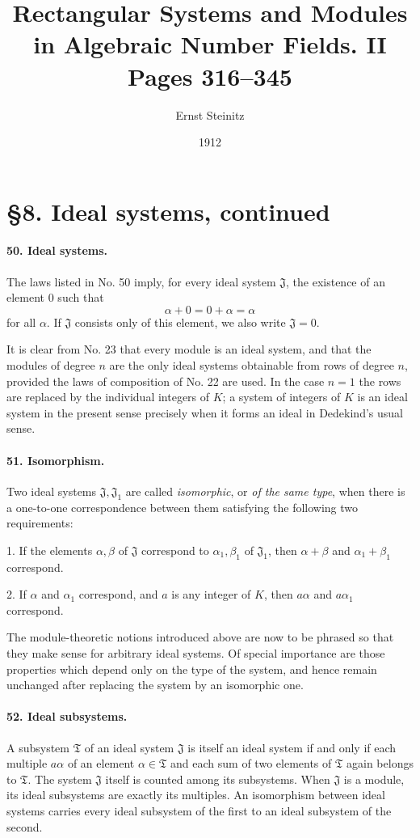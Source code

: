 \documentclass[11pt]{article}
\title{Rectangular Systems and Modules in Algebraic Number Fields. II\\\large Pages 316--345}
\author{Ernst Steinitz}
\date{1912}
\begin{document}
\maketitle

\section*{\S 8. Ideal systems, continued}

\paragraph{50. Ideal systems.}
The laws listed in No. 50 imply, for every ideal system $\mathfrak J$, the existence of an element $0$ such that
\[
  \alpha+0=0+\alpha=\alpha
\]
for all $\alpha$. If $\mathfrak J$ consists only of this element, we also write $\mathfrak J=0$.

It is clear from No. 23 that every module is an ideal system, and that the modules of degree $n$ are the only ideal systems obtainable from rows of degree $n$, provided the laws of composition of No. 22 are used. In the case $n=1$ the rows are replaced by the individual integers of $K$; a system of integers of $K$ is an ideal system in the present sense precisely when it forms an ideal in Dedekind's usual sense.

\paragraph{51. Isomorphism.}
Two ideal systems $\mathfrak J,\mathfrak J_1$ are called \emph{isomorphic}, or \emph{of the same type}, when there is a one-to-one correspondence between them satisfying the following two requirements:

1. If the elements $\alpha,\beta$ of $\mathfrak J$ correspond to $\alpha_1,\beta_1$ of $\mathfrak J_1$, then $\alpha+\beta$ and $\alpha_1+\beta_1$ correspond.

2. If $\alpha$ and $\alpha_1$ correspond, and $a$ is any integer of $K$, then $a\alpha$ and $a\alpha_1$ correspond.

The module-theoretic notions introduced above are now to be phrased so that they make sense for arbitrary ideal systems. Of special importance are those properties which depend only on the type of the system, and hence remain unchanged after replacing the system by an isomorphic one.

\paragraph{52. Ideal subsystems.}
A subsystem $\mathfrak T$ of an ideal system $\mathfrak J$ is itself an ideal system if and only if each multiple $a\alpha$ of an element $\alpha\in\mathfrak T$ and each sum of two elements of $\mathfrak T$ again belongs to $\mathfrak T$. The system $\mathfrak J$ itself is counted among its subsystems. When $\mathfrak J$ is a module, its ideal subsystems are exactly its multiples. An isomorphism between ideal systems carries every ideal subsystem of the first to an ideal subsystem of the second.
\end{document}
